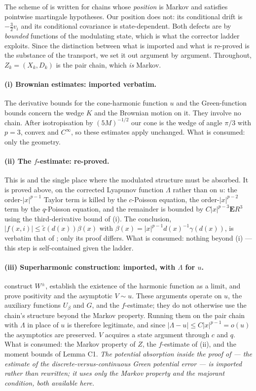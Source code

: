 \documentclass[11pt]{article}
\theoremstyle{definition}
\newcommand{\E}{\mathbf{E}}
\begin{document}
The scheme of \cite{DW,DZ} is written for chains whose \emph{position} is
Markov and satisfies pointwise martingale hypotheses. Our position does not:
its conditional drift is $-\tfrac32v_i$ and its conditional covariance is
state-dependent. Both defects are by \emph{bounded} functions of the modulating
state, which is what the corrector ladder exploits. Since the distinction
between what is imported and what is re-proved is the substance of the
transport, we set it out argument by argument. Throughout, $Z_k=(X_k,D_k)$ is
the pair chain, which \emph{is} Markov.

\paragraph{(i) Brownian estimates: imported verbatim.}
The derivative bounds for the cone-harmonic function $u$ and the Green-function
bounds \cite[Lemmas 7--9]{DZ} concern the wedge $K$ and the Brownian motion on
it. They involve no chain. After isotropisation by $(5M)^{-1/2}$ our cone is
the wedge of angle $\pi/3$ with $p=3$, convex and $C^{\infty}$, so these
estimates apply unchanged. What is consumed: only the geometry.

\paragraph{(ii) The $f$-estimate: re-proved.}
This is \cite[Lemma 10]{DZ} and the single place where the modulated structure
must be absorbed. It is proved above, on the corrected Lyapunov function
$\Lambda$ rather than on $u$: the order-$|x|^{p-1}$ Taylor term is killed by
the $c$-Poisson equation, the order-$|x|^{p-2}$ term by the $q$-Poisson
equation, and the remainder is bounded by $C|x|^{p-3}\E R^{3}$ using the
third-derivative bound of (i). The conclusion,
$|f(x,i)|\le\widetilde\varepsilon(d(x))\beta(x)$ with
$\beta(x)=|x|^{p-1}d(x)^{-1}\gamma(d(x))$, is verbatim that of \cite{DZ}; only
its proof differs. What is consumed: nothing beyond (i) --- this step is
self-contained given the ladder.

\paragraph{(iii) Superharmonic construction: imported, with $\Lambda$ for $u$.}
\cite[Lemmas 11--14]{DZ} construct $W^{\pm}$, establish the existence of the
harmonic function as a limit, and prove positivity and the asymptotic
$V\sim u$. These arguments operate on $u$, the auxiliary functions $U_\beta$
and $G$, and the $f$-estimate; they do not otherwise use the chain's structure
beyond the Markov property. Running them on the pair chain with $\Lambda$ in
place of $u$ is therefore legitimate, and since $|\Lambda-u|\le C|x|^{p-1}=o(u)$
the asymptotics are preserved. $V$ acquires a state argument through $c$ and
$q$. What is consumed: the Markov property of $Z$, the $f$-estimate of (ii),
and the moment bounds of Lemma C1. \emph{The potential absorption inside the
proof of \cite[Lemma 12]{DZ} --- the estimate of the discrete-versus-continuous
Green potential error --- is imported rather than rewritten; it uses only the
Markov property and the majorant condition, both available here.}
\end{document}
